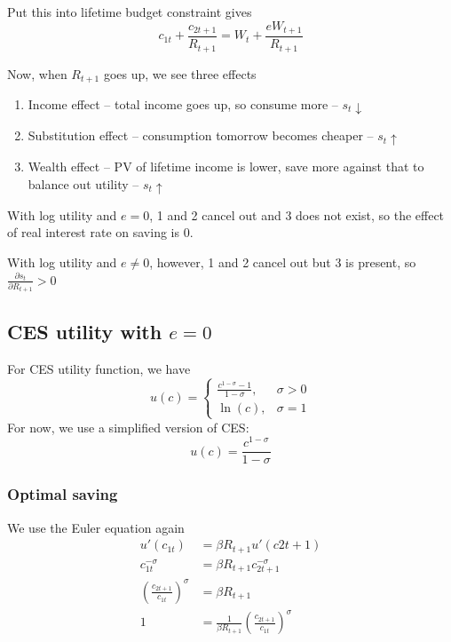 \documentclass[twocolumn, fleqn]{article}
\begin{document}
			Put this into lifetime budget constraint gives
			\[c_{1t}+\frac{c_{2t+1}}{R_{t+1}}=W_t + \frac{e W_{t+1}}{R_{t+1}}\]

			Now, when $R_{t+1}$ goes up, we see three effects
			\begin{enumerate}
				\item Income effect -- total income goes up, so consume more -- $s_t \downarrow$
				\item Substitution effect -- consumption tomorrow becomes cheaper -- $s_t \uparrow$
				\item Wealth effect -- PV of lifetime income is lower, save more against that to balance out utility
				-- $s_t \uparrow$
			\end{enumerate}

			With log utility and $e=0$, 1 and 2 cancel out and 3 does not exist, so the effect of real interest
			rate on saving is 0.

			With log utility and $e\neq 0$, however, 1 and 2 cancel out but 3 is present, so
			$\frac{\partial s_t}{\partial R_{t+1}}>0$

		\subsection{CES utility with $e=0$}\label{subsec:ces-utility}
			For CES utility function, we have
			\begin{equation}
				u(c) =
				\begin{cases}
					\frac{c^{1-\sigma}-1}{1-\sigma}, & \sigma >0\\
					\ln(c), & \sigma =1
				\end{cases}
				\label{eq:CES}
			\end{equation}
			For now, we use a simplified version of CES: \[u(c) = \frac{c^{1-\sigma}}{1-\sigma}\]

			\subsubsection{Optimal saving}
				We use the Euler equation again
				\begin{align*}
					u'(c_{1t}) &= \beta R_{t+1}u'(c{2t+1})\\
					c_{1t}^{-\sigma} &= \beta R_{t+1} c_{2t+1}^{-\sigma}\\
					\left( \frac{c_{2t+1}}{c_{1t}} \right)^{\sigma} &= \beta R_{t+1}\\
					1 &= \frac{1}{\beta R_{t+1}}\left( \frac{c_{2t+1}}{c_{1t}} \right)^{\sigma}
				\end{align*}
\end{document}
